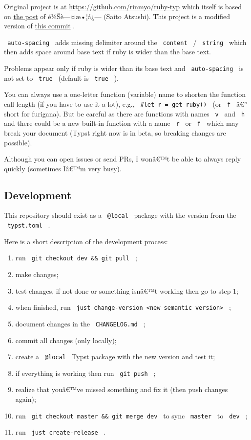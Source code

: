 Original project is at \url{https://github.com/rinmyo/ruby-typ} which
itself is based on
\href{https://zenn.dev/saito_atsushi/articles/ff9490458570e1}{the post}
of é½Šè---¤æ•¦å¿--- (Saito Atsushi). This project is a modified version
of
\href{https://github.com/rinmyo/ruby-typ/commit/23ca86180757cf70f2b9f5851abb5ea5a3b4c6a1}{this
commit} .

\texttt{\ auto-spacing\ } adds missing delimiter around the
\texttt{\ content\ } / \texttt{\ string\ } which then adds space around
base text if ruby is wider than the base text.

Problems appear only if ruby is wider than its base text and
\texttt{\ auto-spacing\ } is not set to \texttt{\ true\ } (default is
\texttt{\ true\ } ).

You can always use a one-letter function (variable) name to shorten the
function call length (if you have to use it a lot), e.g.,
\texttt{\ \#let\ r\ =\ get-ruby()\ } (or \texttt{\ f\ } â€'' short for
furigana). But be careful as there are functions with names
\texttt{\ v\ } and \texttt{\ h\ } and there could be a new built-in
function with a name \texttt{\ r\ } or \texttt{\ f\ } which may break
your document (Typst right now is in beta, so breaking changes are
possible).

Although you can open issues or send PRs, I wonâ€™t be able to always
reply quickly (sometimes Iâ€™m very busy).

\subsection{Development}\label{development}

This repository should exist as a \texttt{\ @local\ } package with the
version from the \texttt{\ typst.toml\ } .

Here is a short description of the development process:

\begin{enumerate}
\tightlist
\item
  run \texttt{\ git\ checkout\ dev\ \&\&\ git\ pull\ } ;
\item
  make changes;
\item
  test changes, if not done or something isnâ€™t working then go to step
  1;
\item
  when finished, run
  \texttt{\ just\ change-version\ \textless{}new\ semantic\ version\textgreater{}\ }
  ;
\item
  document changes in the \texttt{\ CHANGELOG.md\ } ;
\item
  commit all changes (only locally);
\item
  create a \texttt{\ @local\ } Typst package with the new version and
  test it;
\item
  if everything is working then run \texttt{\ git\ push\ } ;
\item
  realize that youâ€™ve missed something and fix it (then push changes
  again);
\item
  run \texttt{\ git\ checkout\ master\ \&\&\ git\ merge\ dev\ } to sync
  \texttt{\ master\ } to \texttt{\ dev\ } ;
\item
  run \texttt{\ just\ create-release\ } .
\end{enumerate}

